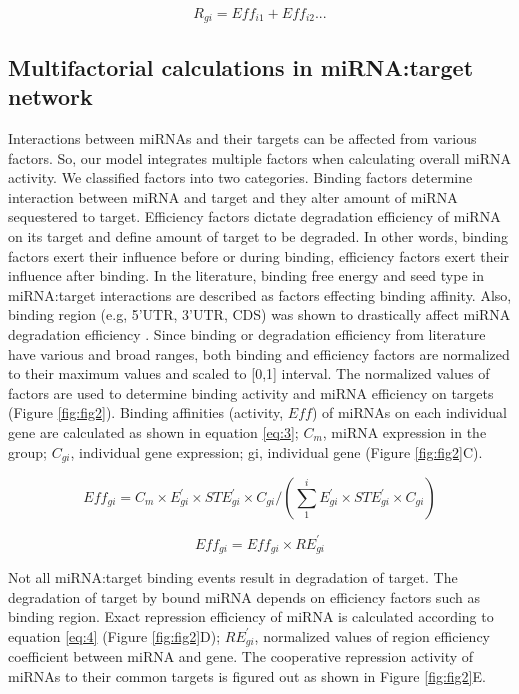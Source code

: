 \documentclass[a4,center,fleqn]{NAR}
\begin{document}
\begin{equation*}
   R_{gi}= Eff_{i1} + Eff_{i2} ... \tag{2}\label{eq:2}
\end{equation*}

\subsection{Multifactorial calculations in miRNA:target network}

Interactions between miRNAs and their targets can be affected from
various factors. So, our model integrates multiple factors when
calculating overall miRNA activity. We classified factors into two
categories. Binding factors determine interaction between miRNA and
target and they alter amount of miRNA sequestered to target. Efficiency
factors dictate degradation efficiency of miRNA on its target and define
amount of target to be degraded. In other words, binding factors exert
their influence before or during binding, efficiency factors exert their
influence after binding. In the literature, binding free energy
\citep{cao_predicting_2012, helwak_mapping_2013} and seed type
\citep{werfel_preferential_2017} in miRNA:target interactions are
described as factors effecting binding affinity. Also, binding region
(e.g, 5'UTR, 3'UTR, CDS) was shown to drastically affect miRNA
degradation efficiency
\citep{hausser_analysis_2013, helwak_mapping_2013}. Since binding or
degradation efficiency from literature have various and broad ranges,
both binding and efficiency factors are normalized to their maximum
values and scaled to {[}0,1{]} interval. The normalized values of
factors are used to determine binding activity and miRNA efficiency on
targets (Figure \ref{fig:fig2}). Binding affinities (activity, \(Eff\))
of miRNAs on each individual gene are calculated as shown in equation
\eqref{eq:3}; \(C_m\), miRNA expression in the group; \(C_{gi}\),
individual gene expression; gi, individual gene (Figure
\ref{fig:fig2}C).

\begin{equation}
Eff_{gi}= C_m \times E^\prime_{gi} \times STE^\prime_{gi} \times C_{gi}/(\sum_{1}^{i} E^\prime_{gi} \times STE^\prime_{gi} \times C_{gi}) \tag{3}\label{eq:3}
\end{equation}

\begin{equation}
Eff_{gi}= Eff_{gi}\times RE^\prime_{gi} \tag{4}\label{eq:4}
\end{equation}

Not all miRNA:target binding events result in degradation of target. The
degradation of target by bound miRNA depends on efficiency factors such
as binding region. Exact repression efficiency of miRNA is calculated
according to equation \eqref{eq:4} (Figure \ref{fig:fig2}D);
\(RE^\prime_{gi}\), normalized values of region efficiency coefficient
between miRNA and gene. The cooperative repression activity of miRNAs to
their common targets is figured out as shown in Figure \ref{fig:fig2}E.
\end{document}
